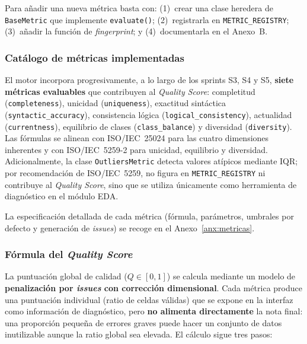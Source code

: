 Para añadir una nueva métrica basta con: (1)~crear una clase heredera de
\texttt{BaseMetric} que implemente \texttt{evaluate()}; (2)~registrarla en
\texttt{METRIC\_REGISTRY}; (3)~añadir la función de \emph{fingerprint};
y (4)~documentarla en el Anexo~B.

\subsubsection{Catálogo de métricas implementadas}

El motor incorpora progresivamente, a lo largo de los sprints S3, S4 y S5,
\textbf{siete métricas evaluables} que contribuyen al \emph{Quality Score}:
completitud (\texttt{completeness}), unicidad (\texttt{uniqueness}),
exactitud sintáctica (\texttt{syntactic\_accuracy}), consistencia lógica
(\texttt{logical\_consistency}), actualidad (\texttt{currentness}),
equilibrio de clases (\texttt{class\_balance}) y diversidad
(\texttt{diversity}).  Las fórmulas se alinean con \ac{ISO}/\ac{IEC}~25024
para las cuatro dimensiones inherentes y con \ac{ISO}/\ac{IEC}~5259-2 para
unicidad, equilibrio y diversidad.  Adicionalmente, la clase
\texttt{OutliersMetric} detecta valores atípicos mediante \ac{IQR}; por
recomendación de \ac{ISO}/\ac{IEC}~5259, no figura en
\texttt{METRIC\_REGISTRY} ni contribuye al \emph{Quality Score}, sino
que se utiliza únicamente como herramienta de diagnóstico en el módulo
\acs{EDA}.

La especificación detallada de cada métrica (fórmula, parámetros,
umbrales por defecto y generación de \emph{issues}) se recoge en el
Anexo~\ref{anx:metricas}.

\subsubsection{Fórmula del \emph{Quality Score}}

La puntuación global de calidad ($Q \in [0{,}1]$) se calcula mediante un
modelo de \textbf{penalización por \emph{issues} con corrección
dimensional}.  Cada métrica produce una puntuación individual (ratio de
celdas válidas) que se expone en la interfaz como información de diagnóstico,
pero \textbf{no alimenta directamente} la nota final: una proporción pequeña
de errores graves puede hacer un conjunto de datos inutilizable aunque la
ratio global sea elevada.  El cálculo sigue tres pasos:

